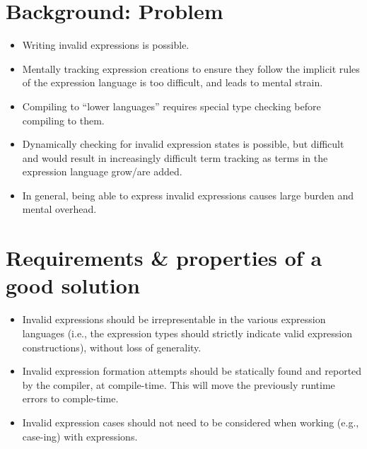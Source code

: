 \section{Background: Problem}

\begin{itemize}
    
    \item Writing invalid expressions is possible.
    
    \item Mentally tracking expression creations to ensure they follow
          the implicit rules of the expression language is too difficult,
          and leads to mental strain.

    \item Compiling to ``lower languages'' requires special type checking
          before compiling to them. 
    
    \item Dynamically checking for invalid expression states is possible,
          but difficult and would result in increasingly difficult term
          tracking as terms in the expression language grow/are added.

    \item In general, being able to express invalid expressions causes
          large burden and mental overhead.
    
\end{itemize}


\section{Requirements \& properties of a good solution}

\begin{itemize}
    
    \item Invalid expressions should be irrepresentable in the various 
          expression languages (i.e., the expression types should strictly
          indicate valid expression constructions), without loss of generality.
    
    \item Invalid expression formation attempts should be statically found
          and reported by the compiler, at compile-time. This will move the 
          previously runtime errors to comple-time.

    \item Invalid expression cases should not need to be considered when
          working (e.g., case-ing) with expressions.

\end{itemize}


